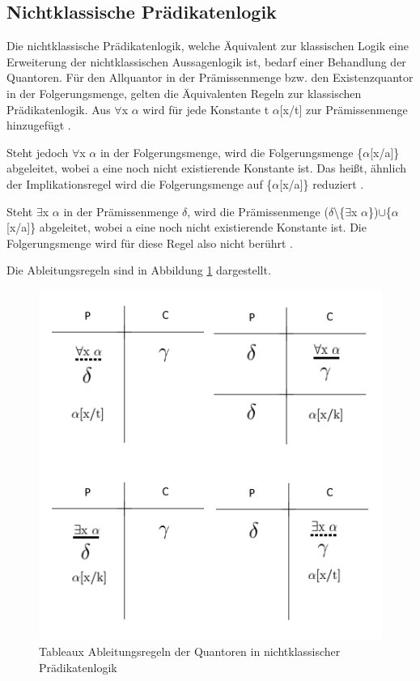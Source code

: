 \subsection{Nichtklassische Prädikatenlogik}
Die nichtklassische Prädikatenlogik, welche Äquivalent zur klassischen Logik eine Erweiterung der nichtklassischen Aussagenlogik ist, bedarf einer Behandlung der Quantoren. Für den Allquantor in der Prämissenmenge bzw. den Existenzquantor in der Folgerungsmenge, gelten die Äquivalenten Regeln zur klassischen Prädikatenlogik. Aus $\forall$x $\alpha$ wird für jede Konstante t $\alpha$[x/t] zur Prämissenmenge hinzugefügt \cite{DGHP99}.

Steht jedoch $\forall$x $\alpha$ in der Folgerungsmenge, wird die Folgerungsmenge \{$\alpha$[x/a]\} abgeleitet, wobei a eine noch nicht existierende Konstante ist. Das heißt, ähnlich der Implikationsregel wird die Folgerungsmenge auf \{$\alpha$[x/a]\} reduziert \cite{DGHP99}.

Steht $\exists$x $\alpha$ in der Prämissenmenge $\delta$, wird die Prämissenmenge ($\delta$\textbackslash \{$\exists$x $\alpha$\})$\cup$\{$\alpha$[x/a]\} abgeleitet, wobei a eine noch nicht existierende Konstante ist. Die Folgerungsmenge wird für diese Regel also nicht berührt \cite{DGHP99}.

Die Ableitungsregeln sind in Abbildung \ref{tableaux_quantors_ifopl} dargestellt.

\begin{figure}[h]
\begin{center}
\includegraphics[scale=0.7]{images/Tableaux_Quantors_IFOPL.png}
\caption{Tableaux Ableitungsregeln der Quantoren in nichtklassischer Prädikatenlogik}
\label{tableaux_quantors_ifopl}
\end{center}
\end{figure}


